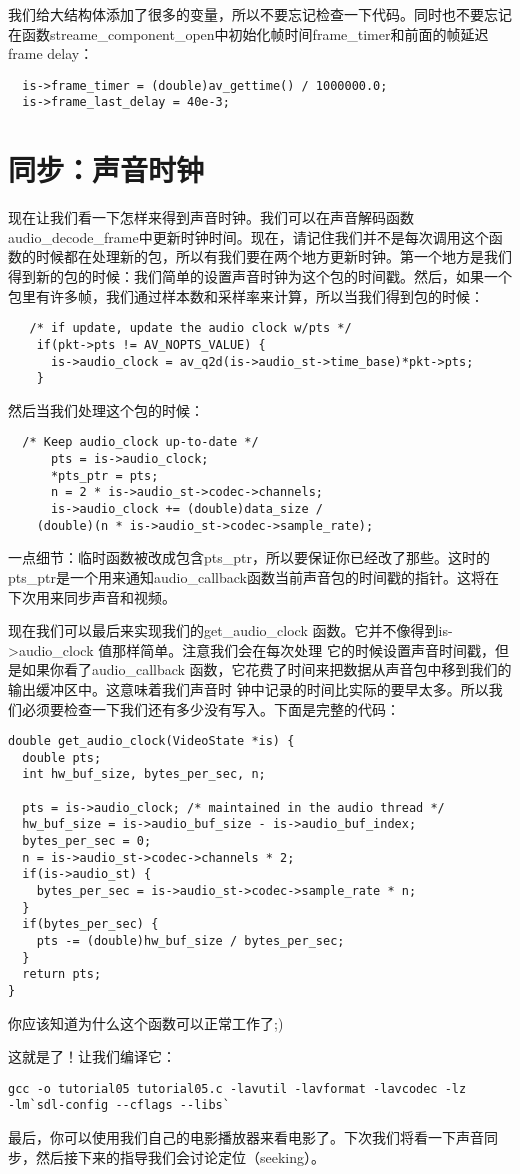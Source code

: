 我们给大结构体添加了很多的变量，所以不要忘记检查一下代码。同时也不要忘记在函数streame_component_open中初始化帧时间frame_timer和前面的帧延迟frame delay：

\begin{lstlisting}
  is->frame_timer = (double)av_gettime() / 1000000.0;
  is->frame_last_delay = 40e-3;
\end{lstlisting}

\section{同步：声音时钟}

现在让我们看一下怎样来得到声音时钟。我们可以在声音解码函数audio_decode_frame中更新时钟时间。现在，请记住我们并不是每次调用这个函数的时候都在处理新的包，所以有我们要在两个地方更新时钟。第一个地方是我们得到新的包的时候：我们简单的设置声音时钟为这个包的时间戳。然后，如果一个包里有许多帧，我们通过样本数和采样率来计算，所以当我们得到包的时候：

\begin{lstlisting}
   /* if update, update the audio clock w/pts */
    if(pkt->pts != AV_NOPTS_VALUE) {
      is->audio_clock = av_q2d(is->audio_st->time_base)*pkt->pts;
    }
\end{lstlisting}
然后当我们处理这个包的时候：
\begin{lstlisting}
  /* Keep audio_clock up-to-date */
      pts = is->audio_clock;
      *pts_ptr = pts;
      n = 2 * is->audio_st->codec->channels;
      is->audio_clock += (double)data_size /
    (double)(n * is->audio_st->codec->sample_rate);
\end{lstlisting}

一点细节：临时函数被改成包含pts_ptr，所以要保证你已经改了那些。这时的pts_ptr是一个用来通知audio_callback函数当前声音包的时间戳的指针。这将在下次用来同步声音和视频。

现在我们可以最后来实现我们的get_audio_clock 函数。它并不像得到is->audio_clock 值那样简单。注意我们会在每次处理 它的时候设置声音时间戳，但是如果你看了audio_callback 函数，它花费了时间来把数据从声音包中移到我们的输出缓冲区中。这意味着我们声音时 钟中记录的时间比实际的要早太多。所以我们必须要检查一下我们还有多少没有写入。下面是完整的代码：

\begin{lstlisting}
double get_audio_clock(VideoState *is) {
  double pts;
  int hw_buf_size, bytes_per_sec, n;

  pts = is->audio_clock; /* maintained in the audio thread */
  hw_buf_size = is->audio_buf_size - is->audio_buf_index;
  bytes_per_sec = 0;
  n = is->audio_st->codec->channels * 2;
  if(is->audio_st) {
    bytes_per_sec = is->audio_st->codec->sample_rate * n;
  }
  if(bytes_per_sec) {
    pts -= (double)hw_buf_size / bytes_per_sec;
  }
  return pts;
}
\end{lstlisting}

你应该知道为什么这个函数可以正常工作了;)

这就是了！让我们编译它：

\begin{lstlisting}
gcc -o tutorial05 tutorial05.c -lavutil -lavformat -lavcodec -lz
-lm`sdl-config --cflags --libs`
\end{lstlisting}

最后，你可以使用我们自己的电影播放器来看电影了。下次我们将看一下声音同步，然后接下来的指导我们会讨论定位（seeking）。
